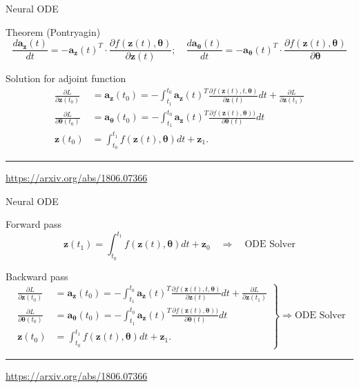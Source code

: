 \documentclass{beamer}
\newcommand{\ba}{\mathbf{a}}
\newcommand{\bz}{\mathbf{z}}
\newcommand{\btheta}{\boldsymbol{\theta}}
\begin{document}
\begin{frame}{Neural ODE}
	\begin{block}{Theorem (Pontryagin)}
		\vspace{-0.3cm}
		\[
		\frac{d \ba_{\bz}(t)}{dt} = - \ba_{\bz}(t)^T \cdot \frac{\partial f(\bz(t), \btheta)}{\partial \bz(t)}; \quad  \frac{d \ba_{\btheta}(t)}{dt} = - \ba_{\btheta}(t)^T \cdot \frac{\partial f(\bz(t), \btheta)}{\partial \btheta}
		\]
	\end{block}
	\begin{block}{Solution for adjoint function}
		\begin{align*}
		 \frac{\partial L}{\partial \bz(t_0)} &= \ba_{\bz}(t_0) =  - \int_{t_1}^{t_0} \ba_{\bz}(t)^T \frac{\partial f(\bz(t), t, \btheta)}{\partial \bz(t)} dt + \frac{\partial L}{\partial \bz(t_1)} \\
		 \frac{\partial L}{\partial \btheta(t_0)} &= \ba_{\btheta}(t_0) =  - \int_{t_1}^{t_0} \ba_{\bz}(t)^T \frac{\partial f(\bz(t), \btheta))}{\partial \btheta(t)} dt \\
		 \bz(t_0) &= \int^{t_1}_{t_0} f(\bz(t), \btheta) d t  + \bz_1.
		\end{align*}
	\end{block}
	\vfill
	\hrule\medskip
	{\scriptsize \href{https://arxiv.org/abs/1806.07366}{https://arxiv.org/abs/1806.07366}} 
\end{frame}
\begin{frame}{Neural ODE}
	\begin{block}{Forward pass}
		\[
		\bz(t_1) = \int^{t_1}_{t_0} f(\bz(t), \btheta) d t  + \bz_0 \quad \Rightarrow \quad \text{ODE Solver}
		\]
	\end{block}
	\begin{block}{Backward pass}
		\small
		\vspace{-0.3cm}
		\begin{equation*}
			{\left.\begin{aligned}
				\frac{\partial L}{\partial \bz(t_0)} &= \ba_{\bz}(t_0) =  - \int_{t_1}^{t_0} \ba_{\bz}(t)^T \frac{\partial f(\bz(t), t, \btheta)}{\partial \bz(t)} dt + \frac{\partial L}{\partial \bz(t_1)} \\
				\frac{\partial L}{\partial \btheta(t_0)} &= \ba_{\btheta}(t_0) =  - \int_{t_1}^{t_0} \ba_{\bz}(t)^T \frac{\partial f(\bz(t), \btheta))}{\partial \btheta(t)} dt \\
				\bz(t_0) &= \int^{t_1}_{t_0} f(\bz(t), \btheta) d t  + \bz_1.
			\end{aligned}\right\rbrace} \Rightarrow
			\text{ODE Solver}
		\end{equation*}
	\end{block}
	\vfill
	\hrule\medskip
	{\scriptsize \href{https://arxiv.org/abs/1806.07366}{https://arxiv.org/abs/1806.07366}} 
\end{frame}
\end{document}
